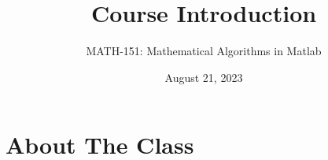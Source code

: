 {}\documentclass[letterpaper,
compress,
xcolor=x11names,
]{beamer}
\begin{document}
	\title{Course Introduction}
	\author{MATH-151:  Mathematical Algorithms in Matlab}
	\date[202X]{August 21, 2023}




\begin{frame}
\titlepage
\end{frame}
\section{About The Class}
\end{document}
